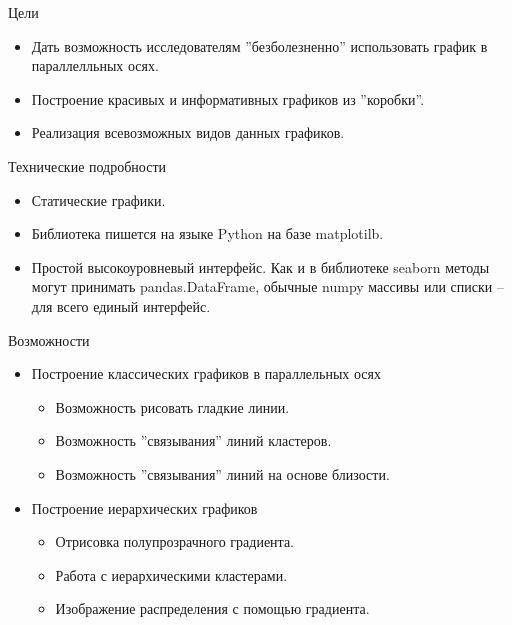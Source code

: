 \documentclass[fleqn, xcolor=x11names]{beamer}
\begin{document}
\begin{frame}{Цели}
    \begin{itemize}
        \item Дать возможность исследователям ''безболезненно'' использовать график
              в параллелльных осях.
        \item Построение красивых и информативных графиков из ''коробки''.
        \item Реализация всевозможных видов данных графиков.
    \end{itemize}
\end{frame}

\begin{frame}{Технические подробности}
    \begin{itemize}
        \item Статические графики.
        \item Библиотека пишется на языке Python на базе matplotilb.
        \item Простой высокоуровневый интерфейс. Как и в библиотеке seaborn методы могут принимать pandas.DataFrame,
              обычные numpy массивы или списки -- для всего единый интерфейс.
    \end{itemize}
\end{frame}

\begin{frame}{Возможности}
    \begin{itemize}
        \item Построение классических графиков в параллельных осях
              \begin{itemize}
                  \item Возможность рисовать гладкие линии.
                  \item Возможность ''связывания'' линий кластеров.
                  \item Возможность ''связывания'' линий на основе близости.
              \end{itemize}
              \vspace{10px}
        \item Построение иерархических графиков
              \begin{itemize}
                  \item Отрисовка полупрозрачного градиента.
                  \item Работа с иерархическими кластерами.
                  \item Изображение распределения с помощью градиента.
              \end{itemize}
    \end{itemize}
\end{frame}
\end{document}
